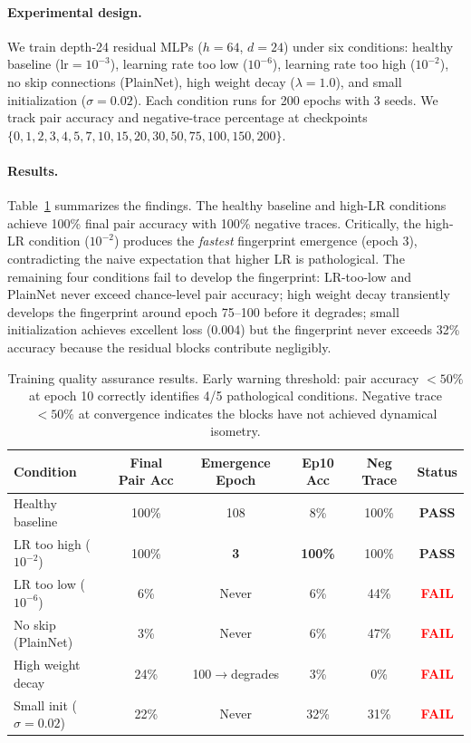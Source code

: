 \documentclass[wcp]{jmlr}
\begin{document}
\paragraph{Experimental design.} We train depth-24 residual MLPs ($h{=}64$, $d{=}24$) under six conditions: healthy baseline ($\text{lr}{=}10^{-3}$), learning rate too low ($10^{-6}$), learning rate too high ($10^{-2}$), no skip connections (PlainNet), high weight decay ($\lambda{=}1.0$), and small initialization ($\sigma{=}0.02$). Each condition runs for 200 epochs with 3 seeds. We track pair accuracy and negative-trace percentage at checkpoints $\{0, 1, 2, 3, 4, 5, 7, 10, 15, 20, 30, 50, 75, 100, 150, 200\}$.

\paragraph{Results.} Table~\ref{tab:training-qa} summarizes the findings. The healthy baseline and high-LR conditions achieve 100\% final pair accuracy with 100\% negative traces. Critically, the high-LR condition ($10^{-2}$) produces the \emph{fastest} fingerprint emergence (epoch 3), contradicting the naive expectation that higher LR is pathological. The remaining four conditions fail to develop the fingerprint: LR-too-low and PlainNet never exceed chance-level pair accuracy; high weight decay transiently develops the fingerprint around epoch 75--100 before it degrades; small initialization achieves excellent loss (0.004) but the fingerprint never exceeds 32\% accuracy because the residual blocks contribute negligibly.

\begin{table}[h]
\centering
\small
\renewcommand{\arraystretch}{1.05}
\begin{tabular}{lccccc}
\toprule
Condition & Final Pair Acc & Emergence Epoch & Ep10 Acc & Neg Trace & Status \\
\midrule
Healthy baseline & 100\% & 108 & 8\% & 100\% & \textcolor{green!60!black}{\textbf{PASS}} \\
LR too high ($10^{-2}$) & 100\% & \textbf{3} & \textbf{100\%} & 100\% & \textcolor{green!60!black}{\textbf{PASS}} \\
\midrule
LR too low ($10^{-6}$) & 6\% & Never & 6\% & 44\% & \textcolor{red}{\textbf{FAIL}} \\
No skip (PlainNet) & 3\% & Never & 6\% & 47\% & \textcolor{red}{\textbf{FAIL}} \\
High weight decay & 24\% & 100$\to$degrades & 3\% & 0\% & \textcolor{red}{\textbf{FAIL}} \\
Small init ($\sigma{=}0.02$) & 22\% & Never & 32\% & 31\% & \textcolor{red}{\textbf{FAIL}} \\
\bottomrule
\end{tabular}
\caption{Training quality assurance results. Early warning threshold: pair accuracy $<50\%$ at epoch 10 correctly identifies 4/5 pathological conditions. Negative trace $<50\%$ at convergence indicates the blocks have not achieved dynamical isometry.}
\label{tab:training-qa}
\end{table}
\end{document}
